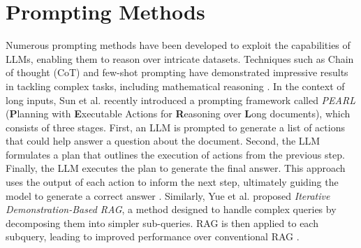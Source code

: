\section{Prompting Methods}

Numerous prompting methods have been developed to exploit the capabilities of LLMs, enabling them to reason over intricate datasets. Techniques such as Chain of thought (CoT) and few-shot prompting have demonstrated impressive results in tackling complex tasks, including mathematical reasoning \cite{wei2023chainofthoughtpromptingelicitsreasoning}. In the context of long inputs, Sun et al. recently introduced a prompting framework called \textit{PEARL} (\textbf{P}lanning with \textbf{E}xecutable Actions for \textbf{R}easoning over \textbf{L}ong documents), which consists of three stages. First, an LLM is prompted to generate a list of actions that could help answer a question about the document. Second, the LLM formulates a plan that outlines the execution of actions from the previous step. Finally, the LLM executes the plan to generate the final answer. This approach uses the output of each action to inform the next step, ultimately guiding the model to generate a correct answer \cite{sun-etal-2024-pearl}. Similarly, Yue et al. proposed \textit{Iterative Demonstration-Based RAG}, a method designed to handle complex queries by decomposing them into simpler sub-queries. RAG is then applied to each subquery, leading to improved performance over conventional RAG \cite{yue2024inferencescalinglongcontextretrieval}.
